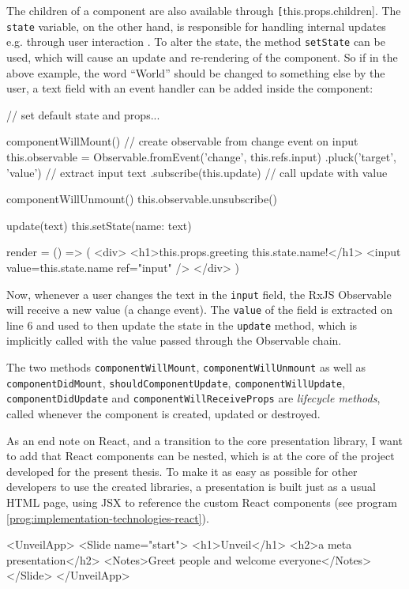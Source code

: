 %
The children of a component are also available through \texttt[this.props.children]. The \texttt{state} variable, on the other hand, is responsible for handling internal updates e.g. through user interaction \cite{react-docu}. To alter the state, the method \texttt{setState} can be used, which will cause an update and re-rendering of the component. So if in the above example, the word ``World'' should be changed to something else by the user, a text field with an event handler can be added inside the component:
%
\begin{JsCode}
// set default state and props...

componentWillMount() {
  // create observable from change event on input
  this.observable = Observable.fromEvent('change', this.refs.input)
    .pluck('target', 'value') // extract input text
    .subscribe(this.update) // call update with value
}

componentWillUnmount() { this.observable.unsubscribe() }

update(text) { this.setState({name: text}) }

render = () => (
  <div>
    <h1>{this.props.greeting} {this.state.name}!</h1>
    <input value={this.state.name} ref="input" />
  </div>
)
\end{JsCode}
%
Now, whenever a user changes the text in the \texttt{input} field, the RxJS Observable will receive a new value (a change event). The \texttt{value} of the field is extracted on line $6$ and used to then update the state in the \texttt{update} method, which is implicitly called with the value passed through the Observable chain.

The two methods \texttt{com\-po\-nent\-Will\-Mount}, \texttt{com\-po\-nent\-Will\-Un\-mount} as well as \texttt{com\-po\-nent\-Did\-Mount}, \texttt{should\-Com\-po\-nent\-Up\-date}, \texttt{com\-po\-nent\-Will\-Up\-date}, \texttt{com\-po\-nent\-Did\-Up\-date} and \texttt{com\-po\-nent\-Will\-Re\-ceive\-Props} are \emph{lifecycle methods}, called whenever the component is created, updated or destroyed.

As an end note on React, and a transition to the core presentation library, I want to add that React components can be nested, which is at the core of the project developed for the present thesis. To make it as easy as possible for other developers to use the created libraries, a presentation is built just as a usual HTML page, using JSX to reference the custom React components (see program \ref{prog:implementation-technologies-react}).
%
\begin{program}
\caption{Nested React components. In this example, a 1-slide-long presentation is created.}
\label{prog:implementation-technologies-react}
\begin{JsCode}
<UnveilApp>
  <Slide name="start">
    <h1>Unveil</h1>
    <h2>a meta presentation</h2>
    <Notes>Greet people and welcome everyone</Notes>
  </Slide>
</UnveilApp>
\end{JsCode}
\end{program}

